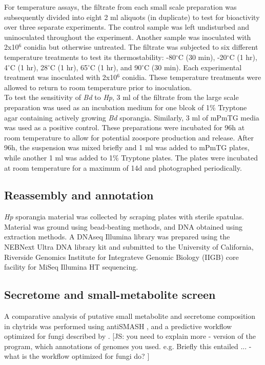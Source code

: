 \indent For temperature assays, the filtrate from each small scale preparation was subsequently divided into eight 2 ml aliquots (in duplicate) to test for bioactivity over three separate experiments. The control sample was left undisturbed and uninoculated throughout the experiment. Another sample was inoculated with 2x10$^{6}$ conidia but otherwise untreated. The filtrate was subjected to six different temperature treatments to test its thermostability: -80$^{\circ}$C (30 min), -20$^{\circ}$C (1 hr), 4$^{\circ}$C (1 hr), 28$^{\circ}$C (1 hr), 65$^{\circ}$C (1 hr), and 90$^{\circ}$C (30 min). Each experimental treatment was inoculated with 2x10$^{6}$ conidia. These temperature treatments were allowed to return to room temperature prior to inoculation.\\
\indent To test the sensitivity of \textit{Bd} to \textit{Hp}, 3 ml of the filtrate from the large scale preparation was used as an incubation medium for one blcok of 1\% Tryptone agar containing actively growing \textit{Bd} sporangia. Similarly, 3 ml of mPmTG media was used as a positive control. These preparations were incubated for 96h at room temperature to allow for potential zoospore production and release. After 96h, the suspension was mixed briefly and 1 ml was added to mPmTG plates, while another 1 ml was added to 1\% Tryptone plates. The plates were incubated at room temperature for a maximum of 14d and photographed periodically.\\
\subsection*{Reassembly and annotation}
\textit{Hp} sporangia material was collected by scraping plates with sterile spatulas. Material was ground using bead-beating methods, and DNA obtained using extraction methods. A DNAseq Illumina library was prepared using the NEBNext Ultra DNA library kit and submitted to the University of California, Riverside Genomics Institute for Integrateve Genomic Biology (IIGB) core facility for MiSeq Illumina HT sequencing.\\
[JS: YOu know you need to add a bunch more details. I guess I need to provide you with this. Describe a) how many reads were generated for DNA, insert size, RNA reads, etc b) ]
\subsection*{Secretome and small-metabolite screen}
A comparative analysis of putative small metabolite and secretome composition in chytrids was performed using antiSMASH \cite{Blin2013}, and a predictive workflow optimized for fungi described by \cite{Min2010}. [JS: you need to explain more - version of the program, which annotations of genomes you used. e.g. Briefly this entailed ... - what is the workflow optimized for fungi do? ]\\
